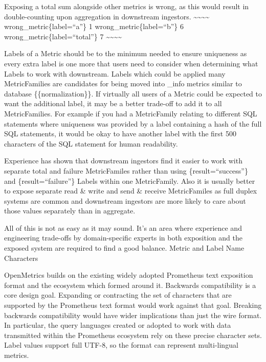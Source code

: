 \documentclass[a4paper,12pt,notitlepage,twoside,openright]{article}
\begin{document}
Exposing a total sum alongside other metrics is wrong, as this would
result in double-counting upon aggregation in downstream ingestors.
\textasciitilde\textasciitilde\textasciitilde\textasciitilde{}
wrong\_metric\{label=``a''\} 1 wrong\_metric\{label=``b''\} 6
wrong\_metric\{label=``total''\} 7
\textasciitilde\textasciitilde\textasciitilde\textasciitilde{}

Labels of a Metric should be to the minimum needed to ensure uniqueness
as every extra label is one more that users need to consider when
determining what Labels to work with downstream. Labels which could be
applied many MetricFamilies are candidates for being moved into \_info
metrics similar to database \{\{normalization\}\}. If virtually all
users of a Metric could be expected to want the additional label, it may
be a better trade-off to add it to all MetricFamilies. For example if
you had a MetricFamily relating to different SQL statements where
uniqueness was provided by a label containing a hash of the full SQL
statements, it would be okay to have another label with the first 500
characters of the SQL statement for human readability.

Experience has shown that downstream ingestors find it easier to work
with separate total and failure MetricFamiles rather than using
\{result=``success''\} and \{result=``failure''\} Labels within one
MetricFamily. Also it is usually better to expose separate read \& write
and send \& receive MetricFamiles as full duplex systems are common and
downstream ingestors are more likely to care about those values
separately than in aggregate.

All of this is not as easy as it may sound. It's an area where
experience and engineering trade-offs by domain-specific experts in both
exposition and the exposed system are required to find a good balance.
Metric and Label Name Characters

OpenMetrics builds on the existing widely adopted Prometheus text
exposition format and the ecosystem which formed around it. Backwards
compatibility is a core design goal. Expanding or contracting the set of
characters that are supported by the Prometheus text format would work
against that goal. Breaking backwards compatibility would have wider
implications than just the wire format. In particular, the query
languages created or adopted to work with data transmitted within the
Prometheus ecosystem rely on these precise character sets. Label values
support full UTF-8, so the format can represent multi-lingual metrics.
\end{document}
